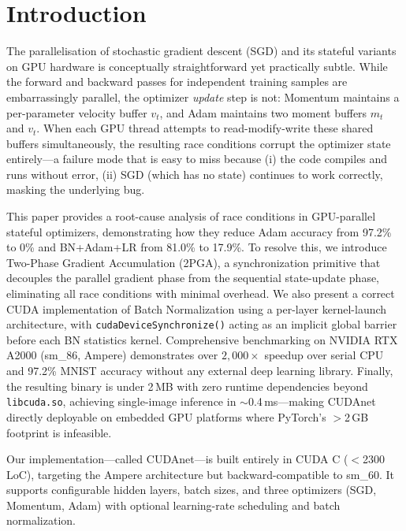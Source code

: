 \documentclass[runningheads]{llncs}
\begin{document}
\section{Introduction}

The parallelisation of stochastic gradient descent (SGD) and its stateful
variants on GPU hardware is conceptually straightforward yet practically
subtle. While the forward and backward passes for independent training
samples are embarrassingly parallel, the optimizer \emph{update} step is
not: Momentum maintains a per-parameter velocity buffer $v_t$, and Adam
maintains two moment buffers $m_t$ and $v_t$. When each GPU thread
attempts to read-modify-write these shared buffers simultaneously, the
resulting race conditions corrupt the optimizer state entirely—a failure
mode that is easy to miss because (i) the code compiles and runs without
error, (ii) SGD (which has no state) continues to work correctly, masking
the underlying bug.

This paper provides a root-cause analysis of race conditions in
GPU-parallel stateful optimizers, demonstrating how they reduce Adam
accuracy from 97.2\% to 0\% and BN+Adam+LR from 81.0\% to 17.9\%. To
resolve this, we introduce Two-Phase Gradient Accumulation (2PGA), a
synchronization primitive that decouples the parallel gradient phase from
the sequential state-update phase, eliminating all race conditions with
minimal overhead. We also present a correct CUDA implementation of Batch
Normalization using a per-layer kernel-launch architecture, with
\mbox{\texttt{cudaDeviceSynchronize()}} acting as an implicit global
barrier before each BN statistics kernel. Comprehensive benchmarking on NVIDIA RTX
A2000 (sm\_86, Ampere) demonstrates over $2{,}000\times$ speedup over
serial CPU and 97.2\% MNIST accuracy without any external deep learning
library. Finally, the resulting binary is under 2\,MB with zero runtime
dependencies beyond \texttt{libcuda.so}, achieving single-image inference
in $\sim$0.4\,ms—making CUDAnet directly deployable on embedded GPU
platforms where PyTorch's $>$2\,GB footprint is infeasible.

Our implementation—called CUDAnet—is built entirely in CUDA C
($<$2300\,LoC), targeting the Ampere architecture but backward-compatible
to sm\_60. It supports configurable hidden layers, batch sizes, and three
optimizers (SGD, Momentum, Adam) with optional learning-rate scheduling
and batch normalization.
\end{document}
